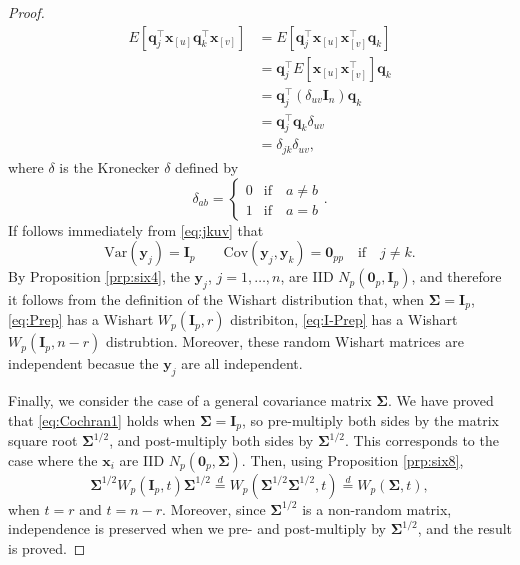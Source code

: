 \documentclass[]{book}
\theoremstyle{definition}
\theoremstyle{definition}
\theoremstyle{definition}
\theoremstyle{remark}
\begin{document}
\begin{proof}
\begin{align}
E[\boldsymbol q_j^\top \boldsymbol x_{[u]} \boldsymbol q_k^\top \boldsymbol x_{[v]}] &=E[\boldsymbol q_j^\top \boldsymbol x_{[u]} \boldsymbol x_{[v]}^\top \boldsymbol q_k]\nonumber \\
&=\boldsymbol q_j^\top E[\boldsymbol x_{[u]} \boldsymbol x_{[v]}^\top ]\boldsymbol q_k \nonumber\\
&=\boldsymbol q_j^\top \left (\delta_{uv}\boldsymbol I_n \right)\boldsymbol q_k \nonumber\\
&=\boldsymbol q_j^\top \boldsymbol q_k \delta_{uv}\nonumber\\
&=\delta_{jk}\delta_{uv},
\label{eq:jkuv}
\end{align}
where \(\delta\) is the Kronecker \(\delta\) defined by
\[
\delta_{ab}=\begin{cases} 0 &\text{if} \quad  a \neq b\\
1 &\text{if} \quad  a=b \end{cases}.
\]
If follows immediately from \eqref{eq:jkuv} that
\[
\text{Var}(\boldsymbol y_j)=\boldsymbol I_p \qquad  \text{Cov}(\boldsymbol y_j , \boldsymbol y_k)={\mathbf 0}_{pp} \quad 
\text{if} \quad  j \neq k.
\]
By Proposition \ref{prp:six4}, the \(\boldsymbol y_j\), \(j=1,\ldots , n\), are IID \(N_p({\mathbf 0}_p , \boldsymbol I_p)\), and therefore it follows from the
definition of the Wishart distribution that, when \(\boldsymbol \Sigma=\boldsymbol I_p\), \eqref{eq:Prep} has a Wishart \(W_p(\boldsymbol I_p,r)\) distribiton, \eqref{eq:I-Prep} has a Wishart \(W_p(\boldsymbol I_p, n-r)\) distrubtion. Moreover, these random Wishart matrices are independent becasue the \(\boldsymbol y_j\) are all independent.

Finally, we consider the case of a general covariance matrix \(\boldsymbol \Sigma\). We have proved that \eqref{eq:Cochran1} holds
when \(\boldsymbol \Sigma=\boldsymbol I_p\), so pre-multiply both sides by the matrix square root \(\boldsymbol \Sigma^{1/2}\), and post-multiply both sides by \(\boldsymbol \Sigma^{1/2}\). This corresponds to the case where the \(\boldsymbol x_i\) are IID \(N_p({\mathbf 0}_p, \boldsymbol \Sigma)\). Then, using Proposition \ref{prp:six8},
\[
\boldsymbol \Sigma^{1/2} W_p(\boldsymbol I_p, t)\boldsymbol \Sigma^{1/2} \stackrel{d}{=} W_p(\boldsymbol \Sigma^{1/2} \boldsymbol \Sigma^{1/2}, t)
\stackrel{d}{=}W_p(\boldsymbol \Sigma,t),
\]
when \(t=r\) and \(t=n-r\). Moreover, since \(\boldsymbol \Sigma^{1/2}\) is a non-random matrix, independence is preserved
when we pre- and post-multiply by \(\boldsymbol \Sigma^{1/2}\), and the result is proved.
\end{proof}
\end{document}
